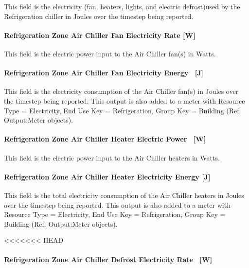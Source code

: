 This field is the electricity (fan, heaters, lights, and electric defrost)used by the Refrigeration chiller in Joules over the timestep being reported.

\paragraph{Refrigeration Zone Air Chiller Fan Electricity Rate {[}W{]}}\label{refrigeration-zone-air-chiller-fan-electric-power-w}

This field is the electric power input to the Air Chiller fan(s) in Watts.

\paragraph{Refrigeration Zone Air Chiller Fan Electricity Energy ~{[}J{]}}\label{refrigeration-zone-air-chiller-fan-electric-energy-j}

This field is the electricity consumption of the Air Chiller fan(s) in Joules over the timestep being reported. This output is also added to a meter with Resource Type = Electricity, End Use Key = Refrigeration, Group Key = Building (Ref. Output:Meter objects).

\paragraph{Refrigeration Zone Air Chiller Heater Electric Power~ {[}W{]}}\label{refrigeration-zone-air-chiller-heater-electric-power-w}

This field is the electric power input to the Air Chiller heaters in Watts.

\paragraph{Refrigeration Zone Air Chiller Heater Electricity Energy {[}J{]}}\label{refrigeration-zone-air-chiller-heater-electric-energy-j}

This field is the total electricity consumption of the Air Chiller heaters in Joules over the timestep being reported. This output is also added to a meter with Resource Type = Electricity, End Use Key = Refrigeration, Group Key = Building (Ref. Output:Meter objects).

<<<<<<< HEAD
\paragraph{Refrigeration Zone Air Chiller Defrost Electricity Rate~ {[}W{]}}\label{refrigeration-zone-air-chiller-defrost-electric-power-w}

